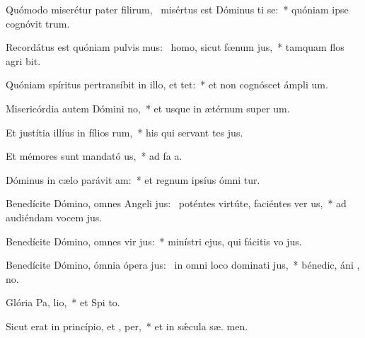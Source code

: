 \item Quómodo miserétur pater filirum,~\pscross{} misértus est Dóminus ti se:~* quóniam ipse cognóvit  trum.
\item Recordátus est quóniam pulvis mus:~\pscross{} homo, sicut fœnum  jus,~* tamquam flos agri  bit.
\item Quóniam spíritus pertransíbit in illo, et  tet:~* et non cognóscet ámpli  um.
\item Misericórdia autem Dómini  no,~* et usque in ætérnum super  um.
\item Et justítia illíus in fílios rum,~* his qui servant tes jus.
\item Et mémores sunt mandató us,~* ad fa a.
\item Dóminus in cælo parávit  am:~* et regnum ipsíus ómni tur.
\item Benedícite Dómino, omnes Angeli jus:~\pscross{} poténtes virtúte, faciéntes ver us,~* ad audiéndam vocem  jus.
\item Benedícite Dómino, omnes vir jus:~* minístri ejus, qui fácitis vo jus.
\item Benedícite Dómino, ómnia ópera jus:~\pscross{} in omni loco dominati jus,~* bénedic, áni , no.
\item Glória Pa,  lio,~* et Spi to.
\item Sicut erat in princípio, et ,  per,~* et in sǽcula sæ. men.
